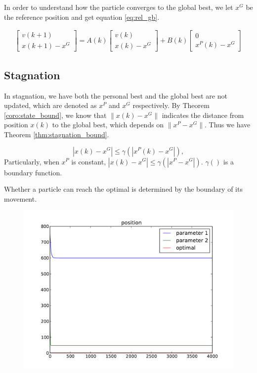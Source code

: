 In order to understand how the particle converges to the global best, we let $ x^{G} $ be the reference position and get equation \eqref{eq:rel_gb}.

\begin{equation}
\label{eq:rel_gb}
\begin{aligned}
\begin{bmatrix}
v(k+1) \\
x(k+1) - x^{G}
\end{bmatrix}
 = A(k) 
\begin{bmatrix}
v(k) \\
x(k) - x^{G}
\end{bmatrix}
+ B(k) 
\begin{bmatrix}
0 \\
x^{P}(k) - x^{G}
\end{bmatrix}
\end{aligned}
\end{equation}

\subsection{Stagnation}

In stagnation, we have both the personal best and the global best are not updated, which are denoted as $ x^{P} $ and $ x^{G} $ respectively.
By Theorem \ref{coro:state_bound}, we know that $ \lVert x(k) - x^{G} \rVert $ indicates the distance from position $ x(k) $ to the global best, which depends on  $ \lVert x^{P} - x^{G} \rVert $.
Thus we have Theorem \ref{thm:stagnation_bound}.

\begin{mythm}
\label{thm:stagnation_bound}
\begin{equation}
| x(k) - x^{G} | \leq \gamma ( | x^{P}(k) - x^{G} | ), 
\end{equation}
Particularly, when $ x^{P} $ is constant,
$  | x(k) - x^{G} | \leq \gamma ( | x^{P} - x^{G} | ). $
$ \gamma () $ is a boundary function.
\end{mythm}


\begin{myprop}
\label{prop:particle:nonoptimal}
Whether a particle can reach the optimal is determined by the boundary of its movement.
\end{myprop}

\begin{figure}[tbph]
\centering
\includegraphics[width=0.7\linewidth]{./simfig/bound/bound_position}
\caption{}
\label{fig:bound_position}
\end{figure}

